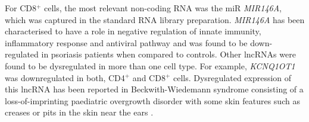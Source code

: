 For CD8$^+$ cells, the most relevant non-coding RNA was the miR \textit{MIR146A}, which was captured in the standard RNA library preparation. \textit{MIR146A} has been characterised to have a role in negative regulation of innate immunity, inflammatory response and antiviral pathway and was found to be down-regulated in psoriasis patients when compared to controls. %
Other lncRNAs were found to be dysregulated in more than one cell type. For example, \textit{KCNQ1OT1} was downregulated in both, CD4$^+$ and CD8$^+$ cells. Dysregulated expression of this lncRNA has been reported in Beckwith-Wiedemann syndrome consisting of a loss-of-imprinting paediatric overgrowth disorder with some skin features such as creases or pits in the skin near the ears \parencite{Pandei2008}.






